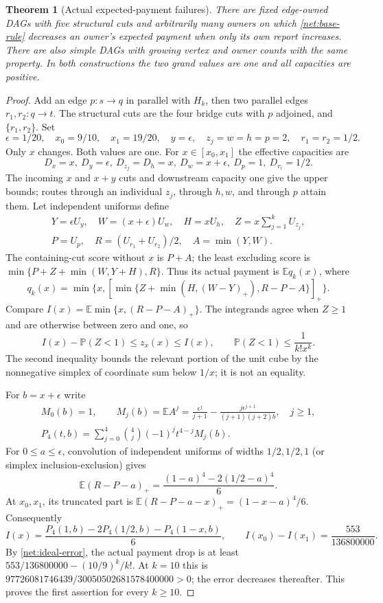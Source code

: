 \documentclass[11pt]{article}
\newtheorem{theorem}{Theorem}[section]
\theoremstyle{definition}\newtheorem{definition}[theorem]{Definition}
\theoremstyle{remark}\newtheorem{remark}[theorem]{Remark}
\newcommand{\E}{\mathbb E}
\newcommand{\Prob}{\mathbb P}
\begin{document}
\begin{theorem}[Actual expected-payment failures]
\label{net:wheatstone-failure}
There are fixed edge-owned DAGs with five structural cuts and arbitrarily
many owners on which \eqref{net:base-rule} decreases an owner's expected
payment when only its own report increases.  There are also simple DAGs
with growing vertex and owner counts with the same property.  In both
constructions the two grand values are one and all capacities are positive.
\end{theorem}
\begin{proof}
Add an edge $p:s\to q$ in parallel with $H_k$, then two parallel edges
$r_1,r_2:q\to t$.  The structural cuts are the four bridge cuts with $p$
adjoined, and $\{r_1,r_2\}$.  Set
\[
 \epsilon=1/20,\quad x_0=9/10,\quad x_1=19/20,\quad y=\epsilon,
 \quad z_j=w=h=p=2,\quad r_1=r_2=1/2.
\]
Only $x$ changes.  Both values are one.  For $x\in[x_0,x_1]$ the effective
capacities are
\[
 D_x=x,\ D_y=\epsilon,\ D_{z_j}=D_h=x,\ D_w=x+\epsilon,
 \ D_p=1,\ D_{r_i}=1/2.
\]
The incoming $x$ and $x+y$ cuts and downstream capacity one give the upper
bounds; routes through an individual $z_j$, through $h,w$, and through $p$
attain them.  Let independent uniforms define
\[
 \begin{gathered}
 Y=\epsilon U_y,\quad W=(x+\epsilon)U_w,\quad H=xU_h,\quad Z=x\sum_{j=1}^kU_{z_j},\\
 P=U_p,\quad R=(U_{r_1}+U_{r_2})/2,\quad A=\min(Y,W).
 \end{gathered}
\]
The containing-cut score without $x$ is $P+A$; the least excluding score
is $\min\{P+Z+\min(W,Y+H),R\}$.  Thus its actual payment is $\E q_k(x)$,
where
\begin{equation}\label{net:wheatstone-q}
 q_k(x)=\min\{x,[\min\{Z+\min(H,(W-Y)_+),R-P-A\}]_+\}.
\end{equation}
Compare $I(x)=\E\min\{x,(R-P-A)_+\}$.  The integrands agree when $Z\ge1$
and are otherwise between zero and one, so
\begin{equation}\label{net:ideal-error}
 I(x)-\Prob(Z<1)\le z_x(x)\le I(x),\qquad
 \Prob(Z<1)\le\frac1{k!x^k}.
\end{equation}
The second inequality bounds the relevant portion of the unit cube by the
nonnegative simplex of coordinate sum below $1/x$; it is not an equality.

For $b=x+\epsilon$ write
\[
 \begin{gathered}
 M_0(b)=1,\qquad M_j(b)=\E A^j=\frac{\epsilon^j}{j+1}
       -\frac{j\epsilon^{j+1}}{(j+1)(j+2)b},\quad j\ge1,\\
 P_4(t,b)=\sum_{j=0}^4\binom4j(-1)^jt^{4-j}M_j(b).
 \end{gathered}
\]
For $0\le a\le\epsilon$, convolution of independent uniforms of widths
$1/2,1/2,1$ (or simplex inclusion-exclusion) gives
\[
 \E(R-P-a)_+=\frac{(1-a)^4-2(1/2-a)^4}{6}.
\]
At $x_0,x_1$, its truncated part is
$\E(R-P-a-x)_+=(1-x-a)^4/6$.
Consequently
\[
 I(x)=\frac{P_4(1,b)-2P_4(1/2,b)-P_4(1-x,b)}6,
 \qquad I(x_0)-I(x_1)=\frac{553}{136800000}.
\]
By \eqref{net:ideal-error}, the actual payment drop is at least
$553/136800000-(10/9)^k/k!$.
At $k=10$ this is
$97726081746439/30050502681578400000>0$; the error decreases thereafter.
This proves the first assertion for every $k\ge10$.


\end{proof}
\end{document}
